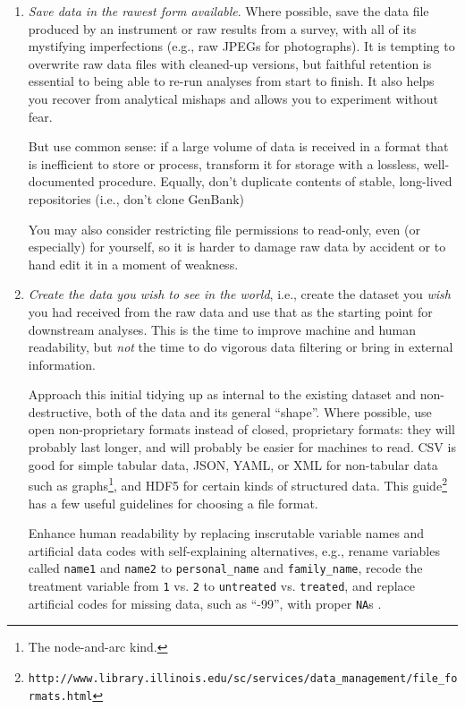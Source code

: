 \documentclass[10pt]{article}
\newcommand{\recommend}[1]{\textit{#1}}
\newcommand{\withurl}[2]{{#1}\footnote{\texttt{#2}}}
\begin{document}
\begin{enumerate}

\item
  \recommend{Save data in the rawest form available}.  Where possible,
  save the data file produced by an instrument or raw results from a
  survey, with all of its mystifying imperfections (e.g., raw JPEGs
  for photographs). It is tempting to overwrite raw data files with
  cleaned-up versions, but faithful retention is essential to being
  able to re-run analyses from start to finish. It also
  helps you recover from
  analytical mishaps and allows you to experiment without fear.

  But use common sense: if a large volume of data is received in a
  format that is inefficient to store or process,
  transform it for storage with a lossless, well-documented
  procedure.  Equally, don't duplicate contents of stable, long-lived
  repositories (i.e., don't clone GenBank)

  You may also consider restricting file permissions to read-only,
  even (or especially) for yourself, so it is harder to damage raw
  data by accident or to hand edit it in a moment of weakness.

\item
  \recommend{Create the data you wish to see in the world}, i.e.,
  create the dataset you \emph{wish} you had received from the raw
  data and use that as the starting point for downstream analyses.
  This is the
  time to improve machine and human readability, but \emph{not}
  the time to do vigorous data filtering or bring in external information.

  Approach this initial tidying up as internal to the existing dataset
  and non-destructive, both of the data and its general
  ``shape''. 
  Where possible, use open non-proprietary formats instead of closed,
  proprietary formats: they will probably last longer, and will
  probably be easier for machines to read.
  CSV is good for simple tabular data,
  JSON, YAML, or XML for non-tabular data such as graphs\footnote{The
  node-and-arc kind.},
  and HDF5 for certain kinds of structured data.
  \withurl{This
    guide}{http://www.library.illinois.edu/sc/services/data\_management/file\_formats.html}
  has a few useful guidelines for choosing a file format.

  Enhance
  human readability by replacing inscrutable variable names and
  artificial data codes with self-explaining alternatives, e.g.,
  rename variables called \texttt{name1} and \texttt{name2} to
  \texttt{personal\_name} and \texttt{family\_name}, recode the
  treatment variable from \texttt{1} vs.  \texttt{2} to
  \texttt{untreated} vs. \texttt{treated}, and replace artificial
  codes for missing data, such as ``-99'', with proper \texttt{NA}s
  \cite{white2013}.


\end{enumerate}
\end{document}
